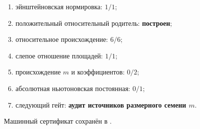 \begin{protocol}\begin{enumerate}
\item эйнштейновская нормировка: \textbf{$1/1$};
\item положительный относительный родитель: \textbf{построен};
\item относительное происхождение: \textbf{$6/6$};
\item слепое отношение площадей: \textbf{$1/1$};
\item происхождение $m$ и коэффициентов: \textbf{$0/2$};
\item абсолютная ньютоновская постоянная: \textbf{$0/1$};
\item следующий гейт: \textbf{аудит источников размерного семени $m$}.
\end{enumerate}\end{protocol}

Машинный сертификат сохранён в
.